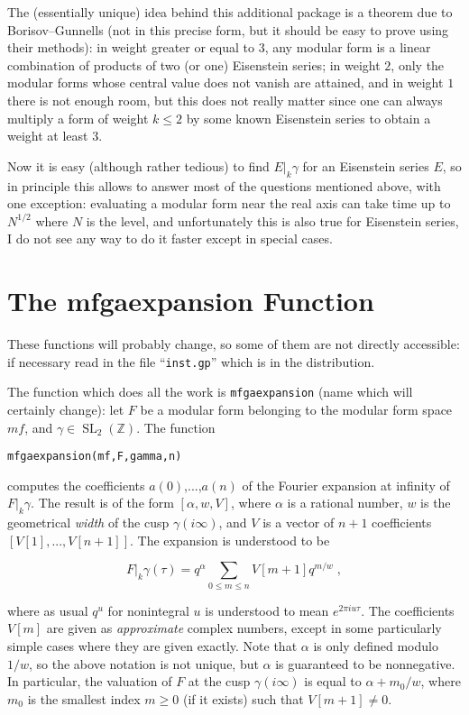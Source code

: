 \documentclass[11pt]{article}
\DeclareMathOperator{\SL}{SL}
\newcommand{\Z}{{\mathbb Z}}
\def\kbd#1{{\tt #1}}
\begin{document}
\medskip

The (essentially unique) idea behind this additional package is a theorem
due to Borisov--Gunnells (not in this precise form, but it should be easy
to prove using their methods): in weight greater or equal to $3$,
any modular form is a linear combination of products of two (or one)
Eisenstein series; in weight $2$, only the modular forms whose
central value does not vanish are attained, and in weight $1$ there is not
enough room, but this does not really matter since one can always multiply
a form of weight $k\le2$ by some known Eisenstein series to obtain
a weight at least $3$.

Now it is easy (although rather tedious) to find $E|_k\gamma$ for an
Eisenstein series $E$, so in principle this allows to answer most of the
questions mentioned above, with one exception: evaluating a modular
form near the real axis can take time up to $N^{1/2}$ where $N$ is the
level, and unfortunately this is also true for Eisenstein series,
I do not see any way to do it faster except in special cases.

\section{The mfgaexpansion Function}

These functions will probably change, so some of them are not directly
accessible: if necessary read in the file ``\kbd{inst.gp}'' which is in the
distribution.

The function which does all the work is \kbd{mfgaexpansion} (name which
will certainly change): let $F$ be a modular form belonging to the modular form
space $mf$, and $\gamma\in \SL_2(\Z)$. The function

\centerline{\kbd{mfgaexpansion(mf,F,gamma,n)}}

computes the coefficients $a(0)$,...,$a(n)$ of the Fourier expansion at
infinity of $F|_k\gamma$. The result is of the form $[\alpha,w,V]$,
where $\alpha$ is a rational number, $w$ is the geometrical \emph{width}
of the cusp $\gamma(i\infty)$, and $V$ is a vector of $n+1$ coefficients
$[V[1],...,V[n+1]]$. The expansion is understood to be

  $$F|_k\gamma(\tau)=q^{\alpha}\sum_{0\le m\le n}V[m+1]q^{m/w}\;,$$

where as usual $q^u$ for nonintegral $u$ is understood to mean
$e^{2\pi iu\tau}$. The coefficients $V[m]$ are given as \emph{approximate}
complex numbers, except in some particularly simple cases where they are
given exactly. Note that $\alpha$ is only defined modulo $1/w$, so the
above notation is not unique, but $\alpha$ is guaranteed to be nonnegative.
In particular, the valuation of $F$ at the cusp $\gamma(i\infty)$ is
equal to $\alpha+m_0/w$, where $m_0$ is the smallest index $m\ge0$
(if it exists) such that $V[m+1]\ne0$.
\end{document}

